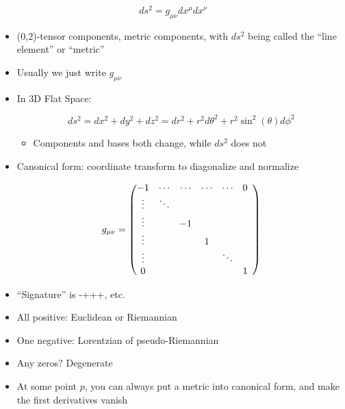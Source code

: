 \begin{itemize}
\begin{itemize}
        $$ds^2=g_{\mu\nu}dx^{\mu}dx^{\nu}$$

        \begin{itemize}

          \item (0,2)-tensor components, metric components, with $ds^2$ being called the ``line element'' or ``metric''

          \item Usually we just write $g_{\mu\nu}$

          \item In 3D Flat Space:

            $$ds^2=dx^2+dy^2+dz^2=dr^2+r^2d\theta^2+r^2\sin^2(\theta)d\phi^2$$

            \begin{itemize}

              \item Components and bases both change, while $ds^2$ does not

            \end{itemize}

          \item Canonical form: coordinate transform to diagonalize and normalize

            $$g_{\mu\nu}=\left( \begin{matrix} -1 & \cdots & \cdots & \cdots & \cdots & 0\\ \vdots & \ddots & & &\\ \vdots & & -1 & &\\ \vdots & & & 1 & \\ \vdots & & & & \ddots & \\ 0 & & & & & 1 \end{matrix}\\\right)$$

          \item ``Signature'' is -+++, etc.

          \item All positive: Euclidean or Riemannian

          \item One negative: Lorentzian of pseudo-Riemannian

          \item Any zeros? Degenerate

          \item At some point $p$, you can always put a metric into canonical form, and make the first derivatives vanish


\end{itemize}
\end{itemize}
\end{itemize}
